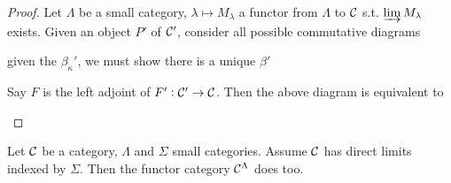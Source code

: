 \documentclass[11pt]{article}
\begin{document}
\begin{proof}
Let \(\Lambda\) be a small category, \(\lambda\mapsto M_\lambda\) a functor from \(\Lambda\) to
\(\mathcal{C}\) s.t. \(\varinjlim M_\lambda\) exists. Given an object \(P'\) of
\(\mathcal{C}'\), consider all possible commutative diagrams
\begin{center}
\end{center}
given the \(\beta_\kappa'\), we must show there is a unique \(\beta'\)

Say \(F\) is the left adjoint of \(F':\mathcal{C}'\to\mathcal{C}\). Then the above
diagram is equivalent to
\begin{center}
\end{center}
\end{proof}

\begin{proposition}[]
\label{6.13}
Let \(\mathcal{C}\) be a category, \(\Lambda\) and \(\Sigma\) small categories. Assume \(\mathcal{C}\) has
direct limits indexed by \(\Sigma\). Then the functor category \(\mathcal{C}^\Lambda\) does too.
\end{proposition}
\end{document}
